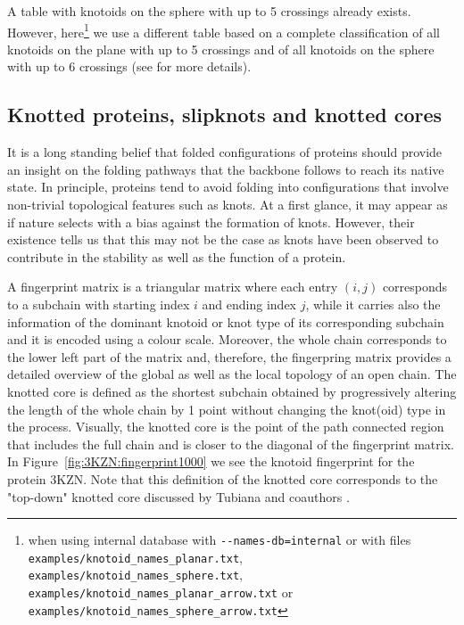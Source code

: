 A table with knotoids on the sphere with up to 5 crossings already exists\cite{bartholomew}. However, here\footnote{when using internal database with \lstinline{--names-db=internal} or with files \lstinline{examples/knotoid_names_planar.txt}, \lstinline{examples/knotoid_names_sphere.txt}, \lstinline{examples/knotoid_names_planar_arrow.txt} or \lstinline{examples/knotoid_names_sphere_arrow.txt}} we use a different table based on a complete classification of all knotoids on the plane with up to 5 crossings and of all knotoids on the sphere with up to 6 crossings (see \cite{goundaroulis2019} for more details).

\subsection{\label{sec:theory:knottedcore}Knotted proteins, slipknots and knotted cores}

It is a long standing belief that folded configurations of proteins should provide an insight on the folding pathways that the backbone follows to reach its native state\cite{Crippen74, Connolly80}. In principle, proteins tend to avoid folding into configurations that involve non-trivial topological features such as knots. At a first glance, it may appear as if nature selects with a bias against the formation of knots. However, their existence\cite{taylor2000} tells us that this may not be the case as knots have been observed to contribute in the stability as well as the function of a protein.

A fingerprint matrix is a triangular matrix where  each entry $(i,j)$ corresponds to a subchain with starting index $i$ and ending index $j$, while it carries also the information of the dominant knotoid or knot type  of its corresponding subchain and it is encoded using a colour scale. Moreover, the whole chain corresponds to the lower left part of the matrix and, therefore, the fingerpring matrix provides a detailed overview of the global as well as the local topology of an open chain.
The knotted core is defined as the shortest subchain obtained by progressively altering the length of the whole chain by 1 point without changing the knot(oid) type in the process. Visually, the knotted core is the  point of the path connected region that includes  the full chain and is closer to the diagonal of the fingerprint matrix. In Figure~\ref{fig:3KZN:fingerprint1000} we see the knotoid fingerprint for the protein 3KZN. Note that this definition of the knotted core corresponds to the "top-down" knotted core discussed by Tubiana and coauthors \cite{tubiana2011}.



